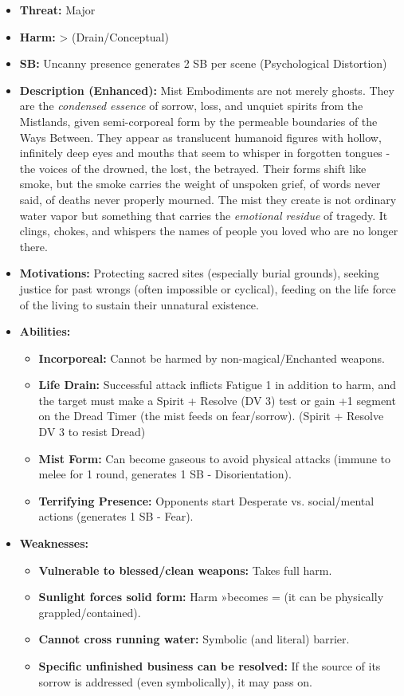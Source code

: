 \documentclass[11pt]{article}
\begin{document}
\begin{itemize}
\item \textbf{Threat:} Major
\item \textbf{Harm:} > (Drain/Conceptual)
\item \textbf{SB:} Uncanny presence generates 2 SB per scene (Psychological Distortion)
\item \textbf{Description (Enhanced):} Mist Embodiments are not merely ghosts. They are the \textit{condensed essence} of sorrow, loss, and unquiet spirits from the Mistlands, given semi-corporeal form by the permeable boundaries of the Ways Between. They appear as translucent humanoid figures with hollow, infinitely deep eyes and mouths that seem to whisper in forgotten tongues - the voices of the drowned, the lost, the betrayed. Their forms shift like smoke, but the smoke carries the weight of unspoken grief, of words never said, of deaths never properly mourned. The mist they create is not ordinary water vapor but something that carries the \textit{emotional residue} of tragedy. It clings, chokes, and whispers the names of people you loved who are no longer there.
\item \textbf{Motivations:} Protecting sacred sites (especially burial grounds), seeking justice for past wrongs (often impossible or cyclical), feeding on the life force of the living to sustain their unnatural existence.
\item \textbf{Abilities:}
\begin{itemize}
\item \textbf{Incorporeal:} Cannot be harmed by non-magical/Enchanted weapons.
\item \textbf{Life Drain:} Successful attack inflicts Fatigue 1 in addition to harm, and the target must make a Spirit + Resolve (DV 3) test or gain +1 segment on the Dread Timer (the mist feeds on fear/sorrow). (Spirit + Resolve DV 3 to resist Dread)
\item \textbf{Mist Form:} Can become gaseous to avoid physical attacks (immune to melee for 1 round, generates 1 SB - Disorientation).
\item \textbf{Terrifying Presence:} Opponents start Desperate vs. social/mental actions (generates 1 SB - Fear).
\end{itemize}
\item \textbf{Weaknesses:}
\begin{itemize}
\item \textbf{Vulnerable to blessed/clean weapons:} Takes full harm.
\item \textbf{Sunlight forces solid form:} Harm »becomes = (it can be physically grappled/contained).
\item \textbf{Cannot cross running water:} Symbolic (and literal) barrier.
\item \textbf{Specific unfinished business can be resolved:} If the source of its sorrow is addressed (even symbolically), it may pass on.
\end{itemize}
\end{itemize}
\end{document}
